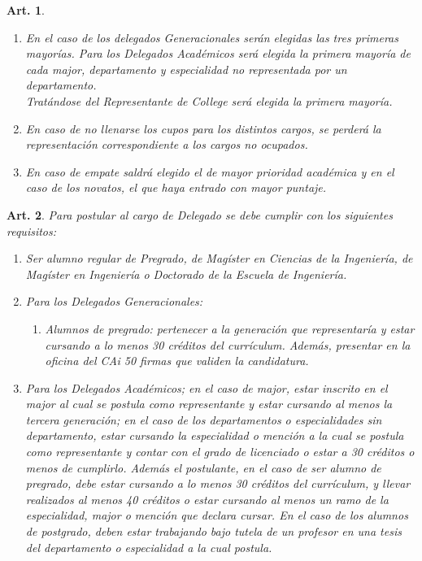 \documentclass[letterpaper,11pt]{article}
\theoremstyle{plain}
\newtheorem{art}{Art.} %
\begin{document}
\begin{art}
\begin{enumerate}
					\begin{enumerate}
						\item En el caso de los delegados Generacionales serán elegidas las tres primeras mayorías. Para los Delegados Académicos será elegida la primera mayoría de cada major, departamento y especialidad no representada por un departamento.
						\\
						Tratándose del Representante de College será elegida la primera mayoría.
						\item En caso de no llenarse los cupos para los distintos cargos, se perderá la representación correspondiente a los cargos no ocupados.
						\item En caso de empate saldrá elegido el de mayor prioridad académica y en el caso de los novatos, el que haya entrado con mayor puntaje.
					\end{enumerate}
			\end{enumerate}
		\end{art}

		\begin{art}\label{requisitosDelegados}
			Para postular al cargo de Delegado se debe cumplir con los siguientes requisitos:
			\begin{enumerate}
				\item Ser alumno regular de Pregrado, de Magíster en Ciencias de la Ingeniería, de Magíster en Ingeniería o Doctorado de la Escuela de Ingeniería.
				\item Para los Delegados Generacionales:
					\begin{enumerate}
						\item Alumnos de pregrado: pertenecer a la generación que representaría y estar cursando a lo menos 30 créditos del currículum. Además, presentar en la oficina del CAi 50 firmas que validen la candidatura.
					\end{enumerate}
				\item Para los Delegados Académicos; en el caso de major, estar inscrito en el major al cual se postula como representante y estar cursando al menos la tercera generación; en el caso de los departamentos o especialidades sin departamento, estar cursando la especialidad o mención a la cual se postula como representante y contar con el grado de licenciado o estar a 30 créditos o menos de cumplirlo. Además el postulante, en el caso de ser alumno de pregrado, debe estar cursando a lo menos 30 créditos del currículum, y llevar realizados al menos 40 créditos o estar cursando al menos un ramo de la especialidad, major o mención que declara cursar. En el caso de los alumnos de postgrado, deben estar trabajando bajo tutela de un profesor en una tesis del departamento o especialidad a la cual postula.
			\end{enumerate}
		\end{art}
\end{document}
